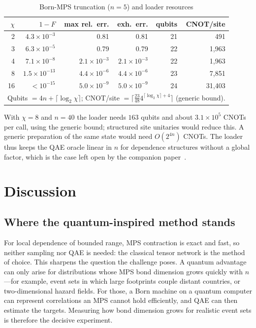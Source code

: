 \documentclass[conference]{IEEEtran}
\begin{document}
\begin{table}[t]
\caption{Born-MPS truncation ($n=5$) and loader resources}
\label{tab:born}
\centering\small
\setlength{\tabcolsep}{2.8pt}
\begin{tabular}{rrrrrr}
\toprule
$\chi$ & $1-F$ & max rel.\ err. & exh.\ err. & qubits & CNOT/site\\
\midrule
2 & $4.3\times10^{-3}$ & 0.81 & 0.81 & 21 & 491\\
3 & $6.3\times10^{-5}$ & 0.79 & 0.79 & 22 & 1{,}963\\
4 & $7.1\times10^{-8}$ & $2.1\times10^{-3}$ & $2.1\times10^{-3}$ & 22 & 1{,}963\\
8 & $1.5\times10^{-13}$ & $4.4\times10^{-6}$ & $4.4\times10^{-6}$ & 23 & 7{,}851\\
16 & $<10^{-15}$ & $5.0\times10^{-9}$ & $5.0\times10^{-9}$ & 24 & 31{,}403\\
\bottomrule
\multicolumn{6}{l}{\footnotesize Qubits $=4n+\lceil\log_2\chi\rceil$; CNOT/site $=\lceil\tfrac{23}{48}4^{\lceil\log_2\chi\rceil+4}\rceil$ (generic bound).}
\end{tabular}
\end{table}

With $\chi=8$ and $n=40$ the loader needs $163$ qubits and about $3.1\times10^{5}$ CNOTs per call, using the generic
bound; structured site unitaries would reduce this. A generic preparation of the same state would need
$O(2^{4n})$ CNOTs. The loader thus keeps the QAE oracle linear in $n$ for dependence structures without a global
factor, which is the case left open by the companion paper~\cite{paper1}.

\section{Discussion}
\subsection{Where the quantum-inspired method stands}
For local dependence of bounded range, MPS contraction is exact and fast, so neither sampling nor QAE is needed:
the classical tensor network is the method of choice. This sharpens the question the challenge poses. A quantum
advantage can only arise for distributions whose MPS bond dimension grows quickly with $n$---for example, event sets
in which large footprints couple distant countries, or two-dimensional hazard fields. For those, a Born machine on a
quantum computer can represent correlations an MPS cannot hold efficiently, and QAE can then estimate the targets.
Measuring how bond dimension grows for realistic event sets is therefore the decisive experiment.
\end{document}
